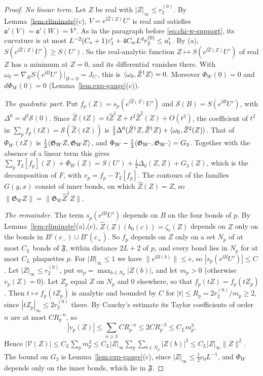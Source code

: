 \begin{proof}
\emph{No linear term.} Let $Z$ be real with $|Z|_\infty\le r^{(0)}_2$. By Lemma~\ref{lem:eliminate}(c), $V=e^{\ii\hat Z(Z)}U'$ is real and satisfies $\mathfrak a'(V)=\mathfrak a'(W)=V'$. As in the paragraph before \eqref{eq:chi-w-support}, its curvature is at most $L^{-2}(C_*+1)\varepsilon'_1+4C_wL^dr^{(0)}_2\le a'_1$. By (a), $S(e^{\ii\hat Z(Z)}U')\ge S(U')$. So the real-analytic function $Z\mapsto S(e^{\ii\hat Z(Z)}U')$ of real $Z$ has a minimum at $Z=0$, and its differential vanishes there. With $\omega_0=\nabla_BS(e^{\ii B}U')|_{B=0}=J_{U'}$, this is $\langle \omega_0,\hat Z^1Z\rangle=0$. Moreover $\Phi_W(0)=0$ and $d\Phi_W(0)=0$ (Lemma~\ref{lem:exp-gauge}(c)).

\emph{The quadratic part.} Put $f_p(Z)=s_p(e^{\ii\hat Z(Z)}U')$ and $\mathcal S(B)=S(e^{\ii B}U')$, with $\Delta^0=d^2\mathcal S(0)$. Since $\hat Z(tZ)=t\hat Z^1Z+t^2\hat Z^2(Z)+O(t^3)$, the coefficient of $t^2$ in $\sum_pf_p(tZ)=\mathcal S(\hat Z(tZ))$ is $\frac12\Delta^0(\hat Z^1Z,\hat Z^1Z)+\langle \omega_0,\hat Z^2(Z)\rangle$. That of $\Phi_W(tZ)$ is $\frac12\langle \mathfrak G_WZ,\mathfrak G_WZ\rangle$, and $\Phi_W-\frac12\langle \mathfrak G_W\cdot,\mathfrak G_W\cdot\rangle=G_3$. Together with the absence of a linear term this gives $\sum_pT_2[f_p](Z)+\Phi_W(Z)=S(U')+\frac12\Delta_0(Z,Z)+G_3(Z)$, which is the decomposition of $F$, with $v_p=f_p-T_2[f_p]$. The contours of the families $G(y,x)$ consist of inner bonds, on which $\hat Z(Z)=Z$, so $\|\mathfrak G_WZ\|=\|\mathfrak G_W\hat Z^1Z\|$.

\emph{The remainder.} The term $s_p(e^{\ii B}U')$ depends on $B$ on the four bonds of $p$. By Lemma~\ref{lem:eliminate}(a),(c), $\hat Z(Z)(b_0(c))=\zeta_c(Z)$ depends on $Z$ only on the bonds in $B'(c_-)\cup B'(c_+)$. So $f_p$ depends on $Z$ only on a set $N_p$ of at most $C_L$ bonds of $\mathfrak F$, within distance $2L+2$ of $p$, and every bond lies in $N_p$ for at most $C_L$ plaquettes $p$. For $|B|_\infty\le1$ we have $\|e^{\ii B(b)}\|\le e$, so $|s_p(e^{\ii B}U')|\le C$. Let $|Z|_\infty\le r^{(0)}_2$, put $m_p=\max_{b\in N_p}|Z(b)|$, and let $m_p>0$ (otherwise $v_p(Z)=0$). Let $Z_p$ equal $Z$ on $N_p$ and $0$ elsewhere, so that $f_p(tZ)=f_p(tZ_p)$. Then $t\mapsto f_p(tZ_p)$ is analytic and bounded by $C$ for $|t|\le R_p=2r^{(0)}_2/m_p\ge2$, since $|tZ_p|_\infty\le2r^{(0)}_2$ there. By Cauchy's estimate its Taylor coefficients of order $n$ are at most $CR_p^{-n}$, so
\[
|v_p(Z)|\le\sum_{n\ge3}CR_p^{-n}\le2CR_p^{-3}\le C_Lm_p^3 .
\]
Hence $|\mathcal V(Z)|\le C_L\sum_pm_p^3\le C_L|Z|_\infty\sum_p\sum_{b\in N_p}|Z(b)|^2\le C_L|Z|_\infty\|Z\|^2$. The bound on $G_3$ is Lemma~\ref{lem:exp-gauge}(c), since $|Z|_\infty\le\frac12c_0L^{-1}$, and $\Phi_W$ depends only on the inner bonds, which lie in $\mathfrak F$.


\end{proof}
